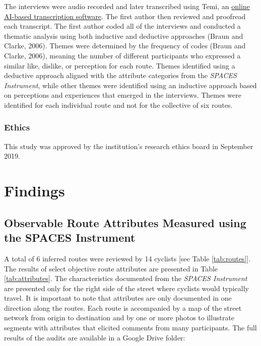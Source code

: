 \documentclass[]{elsarticle} %
\begin{document}
The interviews were audio recorded and later transcribed using Temi, an
\href{https://www.temi.com/}{online AI-based transcription software}.
The first author then reviewed and proofread each transcript. The first
author coded all of the interviews and conducted a thematic analysis
using both inductive and deductive approaches (Braun and Clarke, 2006).
Themes were determined by the frequency of codes (Braun and Clarke,
2006), meaning the number of different participants who expressed a
similar like, dislike, or perception for each route. Themes identified
using a deductive approach aligned with the attribute categories from
the \emph{SPACES Instrument}, while other themes were identified using
an inductive approach based on perceptions and experiences that emerged
in the interviews. Themes were identified for each individual route and
not for the collective of six routes.

\hypertarget{ethics}{%
\subsubsection{Ethics}\label{ethics}}

This study was approved by the institution's research ethics board in
September 2019.

\hypertarget{sec:findings}{%
\section{Findings}\label{sec:findings}}

\hypertarget{observable-route-attributes-measured-using-the-spaces-instrument}{%
\subsection{Observable Route Attributes Measured using the SPACES
Instrument}\label{observable-route-attributes-measured-using-the-spaces-instrument}}

A total of 6 inferred routes were reviewed by 14 cyclists {[}see Table
\ref{tab:routes}{]}. The results of select objective route attributes
are presented in Table \ref{tab:attributes}. The characteristics
documented from the \emph{SPACES Instrument} are presented only for the
right side of the street where cyclists would typically travel. It is
important to note that attributes are only documented in one direction
along the routes. Each route is accompanied by a map of the street
network from origin to destination and by one or more photos to
illustrate segments with attributes that elicited comments from many
participants. The full results of the audits are available in a Google
Drive folder:
\end{document}
